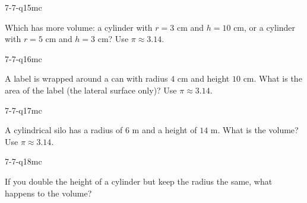 \begin{practiceQuestion}{7-7-q15}{mc}
\begin{questionText}
Which has more volume: a cylinder with $r = 3$ cm and $h = 10$ cm, or a cylinder with $r = 5$ cm and $h = 3$ cm? Use $\pi \approx 3.14$.
\end{questionText}
\end{practiceQuestion}

\begin{practiceQuestion}{7-7-q16}{mc}
\begin{questionText}
A label is wrapped around a can with radius $4$ cm and height $10$ cm. What is the area of the label (the lateral surface only)? Use $\pi \approx 3.14$.
\end{questionText}
\end{practiceQuestion}

\begin{practiceQuestion}{7-7-q17}{mc}
\begin{questionText}
A cylindrical silo has a radius of $6$ m and a height of $14$ m. What is the volume? Use $\pi \approx 3.14$.
\end{questionText}
\end{practiceQuestion}

\begin{practiceQuestion}{7-7-q18}{mc}
\begin{questionText}
If you double the height of a cylinder but keep the radius the same, what happens to the volume?
\end{questionText}
\end{practiceQuestion}


